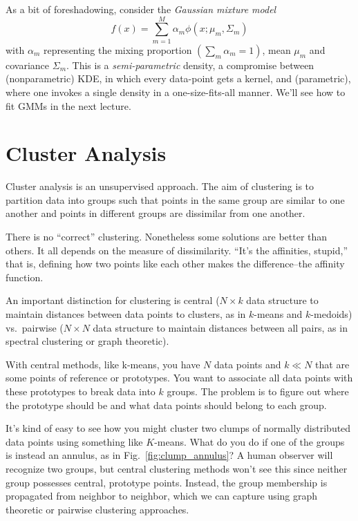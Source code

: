 \documentclass[a4paper]{article}
\begin{document}
As a bit of foreshadowing, consider the \emph{Gaussian mixture model}
$$
f(x) = \sum_{m=1}^{M} \alpha_m \phi(x; \mu_m, \Sigma_m)
$$
with $\alpha_m$ representing the mixing proportion $(\sum_m \alpha_m = 1)$, mean $\mu_m$ and covariance $\Sigma_m$.  This is a \emph{semi-parametric} density, a compromise between (nonparametric) KDE, in which every data-point gets a kernel, and (parametric), where one invokes a single density in a one-size-fits-all manner.  We'll see how to fit GMMs in the next lecture.

\section{Cluster Analysis}

Cluster analysis is an unsupervised approach.  The aim of clustering is to partition data into groups such that points in the same group are similar to one another and points in different groups are dissimilar from one another.

There is no ``correct'' clustering.  Nonetheless some solutions are better than others.  It all depends on the measure of dissimilarity.  ``It's the affinities, stupid,'' that is, defining how two points like each other makes the difference--the affinity function.  

An important distinction for clustering is central ($N \times k$ data structure to maintain distances between data points to clusters, as in $k$-means and $k$-medoids) vs.\ pairwise ($N \times N$ data structure to maintain distances between all pairs, as in spectral clustering or graph theoretic).  


With central methods, like k-means, you have $N$ data points and $k\ll N$ that are some points of reference or prototypes.  You want to associate all data points with these prototypes to break data into $k$ groups.  The problem is to figure out where the prototype should be and what data points should belong to each group.

It's kind of easy to see how you might cluster two clumps of normally distributed data points using something like $K$-means.  What do you do if one of the groups is instead an annulus, as in Fig.\ \ref{fig:clump_annulus}?  A human observer will recognize two groups, but central clustering methods won't see this since neither group possesses central, prototype points.  Instead, the group membership is propagated from neighbor to neighbor, which we can capture using graph theoretic or pairwise clustering approaches.
\end{document}
